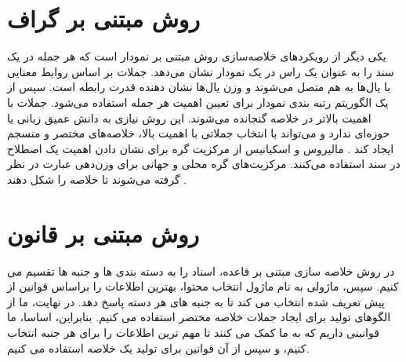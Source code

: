 \section{روش مبتنی بر گراف}
یکی دیگر از رویکردهای خلاصه‌سازی روش مبتنی بر نمودار است که هر جمله در یک سند را به عنوان یک راس در یک نمودار نشان می‌دهد. جملات بر اساس روابط معنایی با یال‌ها به هم متصل می‌شوند و وزن یال‌ها نشان دهنده قدرت رابطه است. سپس از یک الگوریتم رتبه بندی نمودار برای تعیین اهمیت هر جمله استفاده می‌شود. جملات با اهمیت بالاتر در خلاصه گنجانده می‌شوند. این روش نیازی به دانش عمیق زبانی یا حوزه‌ای ندارد و می‌تواند با انتخاب جملاتی با اهمیت بالا، خلاصه‌های مختصر و منسجم ‌ایجاد کند
\cite{andhale2016overview}.
مالیروس و اسکیانیس  از مرکزیت گره برای نشان دادن اهمیت یک اصطلاح در سند استفاده می‌کنند. مرکزیت‌های گره محلی و جهانی برای وزن‌دهی عبارت در نظر گرفته می‌شوند تا خلاصه را شکل دهند
\cite{GraphBased}.
\section{روش مبتنی بر قانون }
در روش خلاصه سازی مبتنی بر قاعده، اسناد را به دسته بندی ها و جنبه ها تقسیم می کنیم. سپس، ماژولی به نام ماژول انتخاب محتوا، بهترین اطلاعات را براساس قوانین از پیش تعریف شده انتخاب می کند تا به جنبه های هر دسته پاسخ دهد. در نهایت، ما از الگوهای تولید برای ایجاد جملات خلاصه مختصر استفاده می کنیم. بنابراین، اساسا، ما قوانینی داریم که به ما کمک می کنند تا مهم ترین اطلاعات را برای هر جنبه انتخاب کنیم، و سپس از آن قوانین برای تولید یک خلاصه استفاده می کنیم\cite{Moratanchsurvey}.









